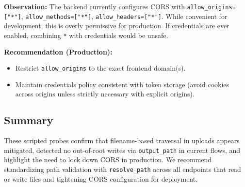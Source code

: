 \documentclass{article}
\begin{document}
\textbf{Observation:} The backend currently configures CORS with \texttt{allow\_origins=["*"]}, \texttt{allow\_methods=["*"]}, \texttt{allow\_headers=["*"]}. While convenient for development, this is overly permissive for production. If credentials are ever enabled, combining \texttt{*} with credentials would be unsafe.

\textbf{Recommendation (Production):}
\begin{itemize}
  \item Restrict \texttt{allow\_origins} to the exact frontend domain(s).
  \item Maintain credentials policy consistent with token storage (avoid cookies across origins unless strictly necessary with explicit origins).
\end{itemize}

\subsection{Summary}
These scripted probes confirm that filename-based traversal in uploads appears mitigated, detected no out-of-root writes via \texttt{output\_path} in current flows, and highlight the need to lock down CORS in production. We recommend standardizing path validation with \texttt{resolve\_path} across all endpoints that read or write files and tightening CORS configuration for deployment.
\end{document}
